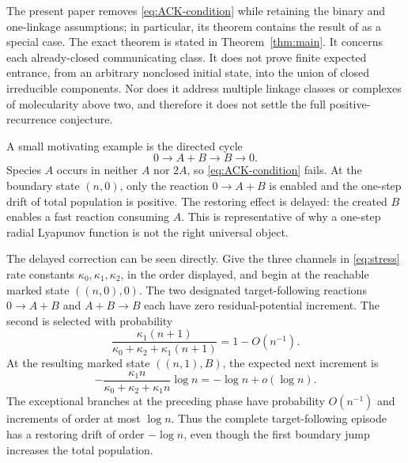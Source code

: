 The present paper removes \eqref{eq:ACK-condition} while retaining the binary
and one-linkage assumptions; in particular, its theorem contains the result of
\citet{AndersonCappellettiKim2020} as a special case.  The exact theorem is
stated in Theorem~\ref{thm:main}.  It concerns each already-closed
communicating class.  It does not prove finite expected entrance, from an
arbitrary nonclosed initial state, into the union of closed irreducible
components.  Nor does it address multiple linkage classes or complexes of
molecularity above two, and therefore it does not settle the full
positive-recurrence conjecture.

A small motivating example is the directed cycle
\begin{equation}\label{eq:stress}
  0\longrightarrow A+B\longrightarrow B\longrightarrow0.
\end{equation}
Species \(A\) occurs in neither \(A\) nor \(2A\), so
\eqref{eq:ACK-condition} fails.  At the boundary state \((n,0)\), only the
reaction \(0\to A+B\) is enabled and the one-step drift of total population
is positive.  The restoring effect is delayed: the created \(B\) enables a
fast reaction consuming \(A\).  This is representative of why a one-step
radial Lyapunov function is not the right universal object.

The delayed correction can be seen directly.  Give the three channels in
\eqref{eq:stress} rate constants \(\kappa_0,\kappa_1,\kappa_2\), in the order
displayed, and begin at the reachable marked state \(((n,0),0)\).  The two
designated target-following reactions \(0\to A+B\) and \(A+B\to B\) each
have zero residual-potential increment.  The second is selected with
probability
\[
 \frac{\kappa_1(n+1)}{\kappa_0+\kappa_2+\kappa_1(n+1)}=1-O(n^{-1}).
\]
At the resulting marked state \(((n,1),B)\), the expected next increment is
\begin{equation}\label{eq:stress-drift}
 -\frac{\kappa_1n}{\kappa_0+\kappa_2+\kappa_1n}\log n
 =-\log n+o(\log n).
\end{equation}
The exceptional branches at the preceding phase have probability
\(O(n^{-1})\) and increments of order at most \(\log n\).  Thus the complete
target-following episode has a restoring drift of order \(-\log n\), even
though the first boundary jump increases the total population.

